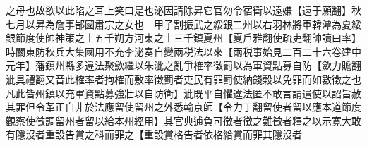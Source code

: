 之母也故欲以此陷之耳上笑曰是也泌因請除昇它官勿令宿衛以遠嫌【遠于願翻】秋七月以昇為詹事郜國肅宗之女也　甲子割振武之綏銀二州以右羽林將軍韓潭為夏綏銀節度使帥神策之士五千朔方河東之士三千鎮夏州【夏戶雅翻使疏吏翻帥讀曰率】　時關東防秋兵大集國用不充李泌奏自變兩税法以來【兩税事始見二百二十六卷建中元年】藩鎮州縣多違法聚歛繼以朱泚之亂爭榷率徵罰以為軍資點募自防【歛力贍翻泚具禮翻又音此榷率者拘榷而敷率徵罰者吏民有罪罰使納錢穀以免罪而如數徵之也凡此皆州鎮以充軍資點募強壯以自防衛】泚既平自懼違法匿不敢言請遣使以詔旨赦其罪但令革正自非於法應留使留州之外悉輸京師【令力丁翻留使者留以應本道節度觀察使徵調留州者留以給本州經用】其官典逋負可徵者徵之難徵者釋之以示寛大敢有隱沒者重設告賞之科而罪之【重設賞格告者依格給賞而罪其隱沒者